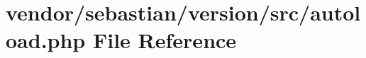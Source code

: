 \section{vendor/sebastian/version/src/autoload.php File Reference}
\label{vendor_2sebastian_2version_2src_2autoload_8php}
